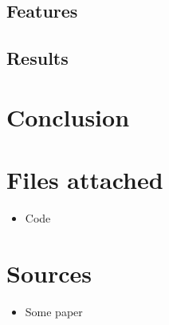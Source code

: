 \documentclass{article}
\begin{document}
\noindent 


\subsection*{Features}


\subsection*{Results}

\pagebreak

\section*{Conclusion}

\section*{Files attached}
\begin{itemize}
\item Code
\end{itemize}

\section*{Sources}

\begin{itemize}

\item Some paper
\end{itemize}
\end{document}
